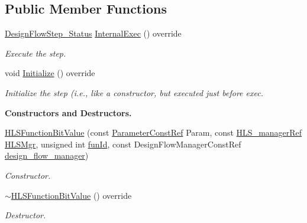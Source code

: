 \subsection*{Public Member Functions}
\begin{DoxyCompactItemize}
\item 
\hyperlink{design__flow__step_8hpp_afb1f0d73069c26076b8d31dbc8ebecdf}{Design\+Flow\+Step\+\_\+\+Status} \hyperlink{classHLSFunctionBitValue_aecc51d6904e74796099fac392b818e7b}{Internal\+Exec} () override
\begin{DoxyCompactList}\small\item\em Execute the step. \end{DoxyCompactList}\item 
void \hyperlink{classHLSFunctionBitValue_aded992799d0c15347a1012e90ebd914a}{Initialize} () override
\begin{DoxyCompactList}\small\item\em Initialize the step (i.\+e., like a constructor, but executed just before exec. \end{DoxyCompactList}\end{DoxyCompactItemize}
\begin{Indent}\textbf{ Constructors and Destructors.}\par
\begin{DoxyCompactItemize}
\item 
\hyperlink{classHLSFunctionBitValue_a26534e8d7235d679fc527d3085722541}{H\+L\+S\+Function\+Bit\+Value} (const \hyperlink{Parameter_8hpp_a37841774a6fcb479b597fdf8955eb4ea}{Parameter\+Const\+Ref} Param, const \hyperlink{hls__manager_8hpp_acd3842b8589fe52c08fc0b2fcc813bfe}{H\+L\+S\+\_\+manager\+Ref} \hyperlink{classHLS__step_ade85003a99d34134418451ddc46a18e9}{H\+L\+S\+Mgr}, unsigned int \hyperlink{classHLSFunctionStep_a3e6434fd86c698b0c70520b859bff5b0}{fun\+Id}, const Design\+Flow\+Manager\+Const\+Ref \hyperlink{classDesignFlowStep_ab770677ddf087613add30024e16a5554}{design\+\_\+flow\+\_\+manager})
\begin{DoxyCompactList}\small\item\em Constructor. \end{DoxyCompactList}\item 
\hyperlink{classHLSFunctionBitValue_acdb33308c741c3d7593a26e4fb573952}{$\sim$\+H\+L\+S\+Function\+Bit\+Value} () override
\begin{DoxyCompactList}\small\item\em Destructor. \end{DoxyCompactList}\end{DoxyCompactItemize}
\end{Indent}
